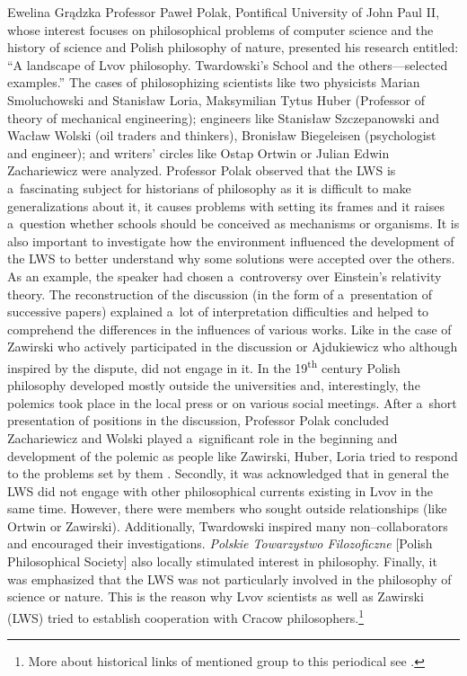 \begin{editorialeng}{Ewelina Grądzka}
Professor Paweł Polak, Pontifical University of John Paul II, whose interest focuses on philosophical problems of computer science and the history of science and Polish philosophy of nature, presented his research entitled: ``A landscape of Lvov philosophy. Twardowski’s School and the others---selected examples.'' The cases of philosophizing scientists like two physicists Marian Smoluchowski and Stanisław Loria, Maksymilian Tytus Huber (Professor of theory of mechanical engineering); engineers like Stanisław Szczepanowski and Wacław Wolski (oil traders and thinkers), Bronisław Biegeleisen (psychologist and engineer); and writers’ circles like Ostap Ortwin or Julian Edwin Zachariewicz were analyzed. Professor Polak observed that the LWS is a~fascinating subject for historians of philosophy as it is difficult to make generalizations about it, it causes problems with setting its frames and it raises a~question whether schools should be conceived as mechanisms or organisms. It is also important to investigate how the environment influenced the development of the LWS to better understand why some solutions were accepted over the others. As an example, the speaker had chosen a~controversy over Einstein’s relativity theory. The reconstruction of the discussion (in the form of a~presentation of successive papers) explained a~lot of interpretation difficulties and helped to comprehend the differences in the influences of various works. Like in the case of Zawirski who actively participated in the discussion or Ajdukiewicz who although inspired by the dispute, did not engage in it. In the 19\textsuperscript{th} century Polish philosophy developed mostly outside the universities and, interestingly, the polemics took place in the local press or on various social meetings. After a~short presentation of positions in the discussion, Professor Polak concluded Zachariewicz and Wolski played a~significant role in the beginning and development of the polemic as people like Zawirski, Huber, Loria tried to respond to the problems set by them
\parencite[see also][]{polak_philosophy_2016}. %
 Secondly, it was acknowledged that in general the LWS did not engage with other philosophical currents existing in Lvov in the same time. However, there were members who sought outside relationships (like Ortwin or Zawirski). Additionally, Twardowski inspired many non--collaborators and encouraged their investigations. \textit{Polskie Towarzystwo Filozoficzne} [Polish Philosophical Society] also locally stimulated interest in philosophy. Finally, it was emphasized that the LWS was not particularly involved in the philosophy of science or nature. This is the reason why Lvov scientists as well as Zawirski (LWS) tried to establish cooperation with Cracow philosophers.\footnote{More about historical links of mentioned group to this periodical see 
\parencite[][]{trombik_origin_2019}.%
}


\end{editorialeng}
